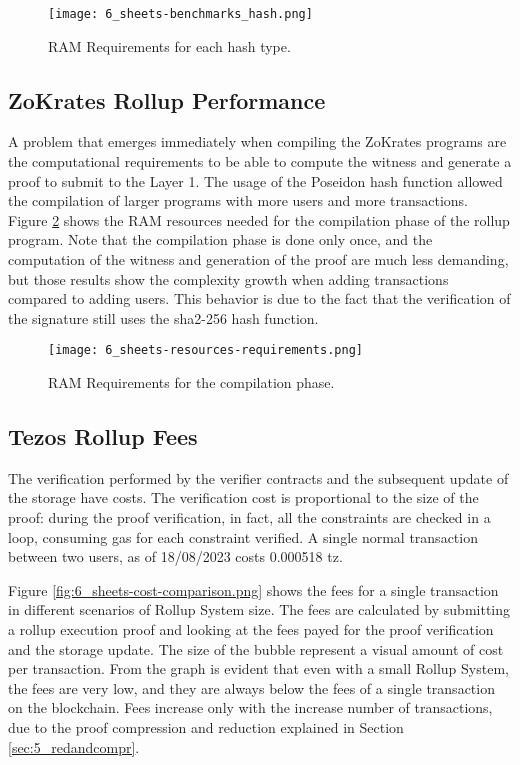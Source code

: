 \begin{figure}[ht]
	\centering
	\texttt{[image: 6\_sheets-benchmarks\_hash.png]}
	\caption[RAM Usage hash]{RAM Requirements for each hash type.}  
	\label{fig:6_sheets-benchmarks_hash.png}
  \end{figure} 

\subsection{ZoKrates Rollup Performance\label{subsec:6_zokratesperf}}

A problem that emerges immediately when compiling the ZoKrates programs are the computational requirements to be able to compute the witness and generate a proof to submit to the Layer 1. The usage of the Poseidon hash function allowed the compilation of larger programs with more users and more transactions. Figure \ref{fig:6_sheets-resources-requirements.png} shows the RAM resources needed for the compilation phase of the rollup program. Note that the compilation phase is done only once, and the computation of the witness and generation of the proof are much less demanding, but those results show the complexity growth when adding transactions compared to adding users. This behavior is due to the fact that the verification of the signature still uses the sha2-256 hash function.

\begin{figure}[ht]
	\centering
	\texttt{[image: 6\_sheets-resources-requirements.png]}
	\caption[RAM Requirements]{RAM Requirements for the compilation phase.}  
	\label{fig:6_sheets-resources-requirements.png}
  \end{figure} 

\subsection{Tezos Rollup Fees}

The verification performed by the verifier contracts and the subsequent update of the storage have costs. The verification cost is proportional to the size of the proof: during the proof verification, in fact, all the constraints are checked in a loop, consuming gas for each constraint verified. A single normal transaction between two users, as of 18/08/2023 costs 0.000518 tz.

Figure \ref{fig:6_sheets-cost-comparison.png} shows the fees for a single transaction in different scenarios of Rollup System size. The fees are calculated by submitting a rollup execution proof and looking at the fees payed for the proof verification and the storage update. The size of the bubble represent a visual amount of cost per transaction. From the graph is evident that even with a small Rollup System, the fees are very low, and they are always below the fees of a single transaction on the blockchain. Fees increase only with the increase number of transactions, due to the proof compression and reduction explained in Section \ref{sec:5_redandcompr}.

